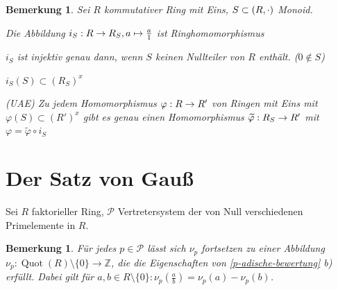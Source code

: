 \documentclass[a4paper,10pt,german]{scrbook}
\theoremstyle{saetze}
\theoremstyle{definitionen}
\newtheorem{Bem}[Def]{Bemerkung}
\begin{document}
\begin{Bem}
Sei $R$ kommutativer Ring mit Eins, $S
\subset (R,\cdot)$ Monoid.
\begin{enum}
\item Die Abbildung $i_S: R\rightarrow R_S, a\mapsto \frac{a}{1}$ ist
Ringhomomorphismus

\item $i_S$ ist injektiv genau dann, wenn $S$ keinen Nullteiler von $R$
enthält. ($0 \not \in S$)


\item $i_S(S) \subset (R_S)^x$


\item (UAE) Zu jedem Homomorphismus $\varphi: R \rightarrow R'$ von Ringen
mit Eins mit $\varphi(S) \subset (R')^x$ gibt es genau einen
Homomorphismus $\widetilde{\varphi}:R_S \rightarrow R'$ mit $\varphi =
\widetilde{\varphi} \circ i_S$


\end{enum}
\end{Bem}

\section{Der Satz von Gauß}

Sei $R$ faktorieller Ring, $\mathcal{P}$ Vertretersystem
der von Null verschiedenen Primelemente in $R$.

\begin{Bem}
Für jedes $p\in \mathcal P$ lässt sich $\nu_p$ fortsetzen zu einer Abbildung $\nu_p: \operatorname{Quot}(R)\setminus\{0\} \to \mathbb Z$, die die Eigenschaften von \ref{p-adische-bewertung} b) erfüllt. Dabei gilt für $a,b\in R\setminus\{0\}: \nu_p(\frac ab) = \nu_p(a) - \nu_p(b)$.
\end{Bem}

\end{document}

